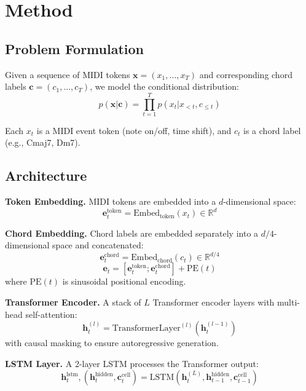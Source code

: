 \documentclass{article}
\begin{document}
\section{Method}
\label{sec:method}

\subsection{Problem Formulation}

Given a sequence of MIDI tokens $\mathbf{x} = (x_1, \ldots, x_T)$ and corresponding chord labels $\mathbf{c} = (c_1, \ldots, c_T)$, we model the conditional distribution:
\begin{equation}
p(\mathbf{x}|\mathbf{c}) = \prod_{t=1}^T p(x_t | x_{<t}, c_{\leq t})
\end{equation}

Each $x_t$ is a MIDI event token (note on/off, time shift), and $c_t$ is a chord label (e.g., Cmaj7, Dm7).

\subsection{Architecture}

\textbf{Token Embedding.}
MIDI tokens are embedded into a $d$-dimensional space:
\begin{equation}
\mathbf{e}_t^{\text{token}} = \text{Embed}_{\text{token}}(x_t) \in \mathbb{R}^d
\end{equation}

\textbf{Chord Embedding.}
Chord labels are embedded separately into a $d/4$-dimensional space and concatenated:
\begin{equation}
\mathbf{e}_t^{\text{chord}} = \text{Embed}_{\text{chord}}(c_t) \in \mathbb{R}^{d/4}
\end{equation}
\begin{equation}
\mathbf{e}_t = [\mathbf{e}_t^{\text{token}}; \mathbf{e}_t^{\text{chord}}] + \text{PE}(t)
\end{equation}
where $\text{PE}(t)$ is sinusoidal positional encoding.

\textbf{Transformer Encoder.}
A stack of $L$ Transformer encoder layers with multi-head self-attention:
\begin{equation}
\mathbf{h}_t^{(l)} = \text{TransformerLayer}^{(l)}(\mathbf{h}_t^{(l-1)})
\end{equation}
with causal masking to ensure autoregressive generation.

\textbf{LSTM Layer.}
A 2-layer LSTM processes the Transformer output:
\begin{equation}
\mathbf{h}_t^{\text{lstm}}, (\mathbf{h}_t^{\text{hidden}}, \mathbf{c}_t^{\text{cell}}) = \text{LSTM}(\mathbf{h}_t^{(L)}, \mathbf{h}_{t-1}^{\text{hidden}}, \mathbf{c}_{t-1}^{\text{cell}})
\end{equation}
\end{document}
